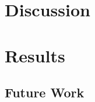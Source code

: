 \documentclass[12pt]{article}
\begin{document}
\section{Discussion}

\section{Results}

\subsection{Future Work}
\end{document}
